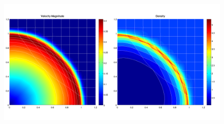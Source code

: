 \documentclass[8pt,xcolor=svgnames]{beamer}
\begin{document}
\begin{frame}
\begin{figure}[ht]
\begin{animateinline}[autoplay,width=\textwidth]{1}
    \newframe[1]
    \includegraphics{./Images/SedovAnimation/SedovAnimation_200.png}
    \end{animateinline}
\end{figure}
\end{frame}
\end{document}
